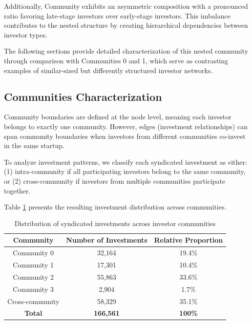 Additionally, Community \interestingCommunity{} exhibits an asymmetric composition with a pronounced ratio favoring late-stage investors over early-stage investors. This imbalance contributes to the nested structure by creating hierarchical dependencies between investor types.

The following sections provide detailed characterization of this nested community through comparison with Communities 0 and 1, which serve as contrasting examples of similar-sized but differently structured investor networks.



\subsection{Communities Characterization}

Community boundaries are defined at the node level, meaning each investor belongs to exactly one community. However, edges (investment relationships) can span community boundaries when investors from different communities co-invest in the same startup.

To analyze investment patterns, we classify each syndicated investment as either: (1) intra-community if all participating investors belong to the same community, or (2) cross-community if investors from multiple communities participate together.

Table \ref{tab:investment_distribution} presents the resulting investment distribution across communities.

\begin{table}[htbp]
\centering
\begin{tabular}{|c|c|c|}
\hline
\textbf{Community} & \textbf{Number of Investments} & \textbf{Relative Proportion} \\
\hline
Community 0 & 32,164 & 19.4\% \\
Community 1 & 17,301 & 10.4\% \\
Community 2 & 55,863 & 33.6\% \\
Community 3 & 2,904 & 1.7\% \\
Cross-community & 58,329 & 35.1\% \\
\hline
\textbf{Total} & \textbf{166,561} & \textbf{100\%} \\
\hline
\end{tabular}
\caption{Distribution of syndicated investments across investor communities}
\label{tab:investment_distribution}
\end{table}

